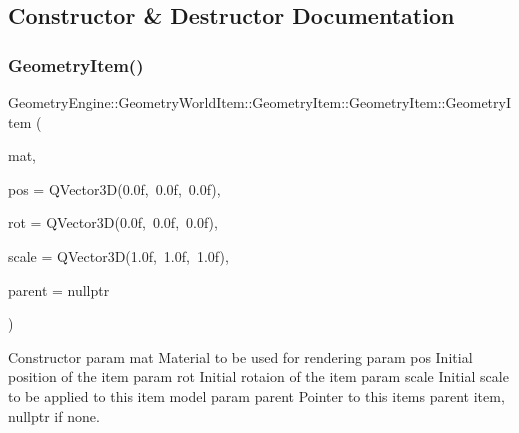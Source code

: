 \subsection{Constructor \& Destructor Documentation}
\mbox{\label{class_geometry_engine_1_1_geometry_world_item_1_1_geometry_item_1_1_geometry_item_a4e952dc4d555e736786b78a79e9f5ad4}} 
\subsubsection{\texorpdfstring{GeometryItem()}{GeometryItem()}\hspace{0.1cm}{\footnotesize\ttfamily [1/2]}}
{\footnotesize\ttfamily Geometry\+Engine\+::\+Geometry\+World\+Item\+::\+Geometry\+Item\+::\+Geometry\+Item\+::\+Geometry\+Item (\begin{DoxyParamCaption}\item[{const \mbox{\hyperlink{class_geometry_engine_1_1_geometry_material_1_1_material}{Geometry\+Material\+::\+Material}} \&}]{mat,  }\item[{const Q\+Vector3D \&}]{pos = {\ttfamily QVector3D(0.0f,~0.0f,~0.0f)},  }\item[{const Q\+Vector3D \&}]{rot = {\ttfamily QVector3D(0.0f,~0.0f,~0.0f)},  }\item[{const Q\+Vector3D \&}]{scale = {\ttfamily QVector3D(1.0f,~1.0f,~1.0f)},  }\item[{\mbox{\hyperlink{class_geometry_engine_1_1_geometry_world_item_1_1_world_item}{World\+Item}} $\ast$}]{parent = {\ttfamily nullptr} }\end{DoxyParamCaption})}

Constructor param mat Material to be used for rendering param pos Initial position of the item param rot Initial rotaion of the item param scale Initial scale to be applied to this item model param parent Pointer to this items parent item, nullptr if none. \mbox{\label{class_geometry_engine_1_1_geometry_world_item_1_1_geometry_item_1_1_geometry_item_abf5badf6ed7138295b6a2b635ff1cf53}} 
